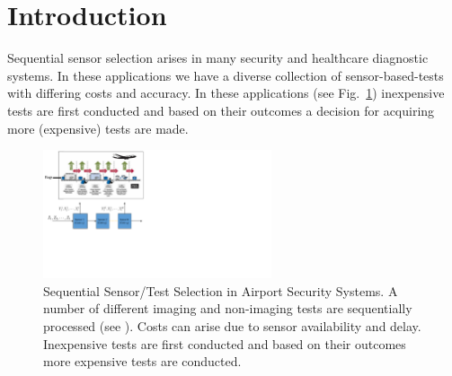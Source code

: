 \documentclass[11pt]{article} %
\newcommand{\ses}{sensor selection\xspace}
\begin{document}
\section{Introduction}
%
Sequential \ses arises in many security and healthcare diagnostic systems. In these applications we have a diverse collection of sensor-based-tests with differing costs and accuracy. %
In these applications (see Fig.~\ref{motiv}) inexpensive tests are first conducted and based on their outcomes a decision for acquiring more (expensive) tests are made. %
\begin{figure}[t]
  \centering
  \includegraphics[width=0.6\textwidth]{motiv.pdf}
  \caption{\footnotesize Sequential Sensor/Test Selection in Airport Security Systems. A number of different imaging and non-imaging tests are sequentially processed (see \cite{ML13_MultistageClassifier_TrapezSaligramaCastanon}). Costs can arise due to sensor availability and delay. Inexpensive tests are first conducted and based on their outcomes more expensive tests are conducted.}
  \label{motiv}
\end{figure}
\end{document}
